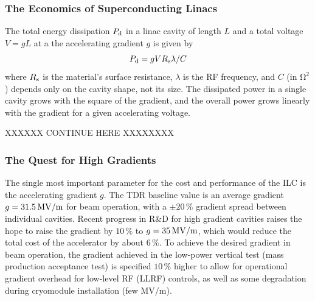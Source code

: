 \subsubsection{The Economics of Superconducting Linacs}

The total energy dissipation $P_{\mathrm{d}}$ in a linac cavity of length $L$ and a total voltage $V = g L$ at a the accelerating gradient $g$ is given by
$$
  P_{\mathrm{d}} = g V R_{\mathrm{s}} \lambda / C
$$
where $R_{\mathrm{s}}$ is the material's surface resistance, $\lambda$ is the RF frequency, and $C$ (in ${\mathrm{\Omega^2}}$) depends only on the cavity shape, not its size.
The dissipated power in a single cavity grows with the square of the gradient, 
and the overall power grows linearly with the gradient for a given accelerating voltage.

XXXXXX CONTINUE HERE XXXXXXXX


\subsubsection{The Quest for High Gradients}

The single most important parameter for the cost and performance of the ILC is the accelerating gradient $g$.
The TDR baseline value is an average gradient $g = 31.5\,{\mathrm{MV/m}}$ for beam operation, with a $\pm 20\,\%$ gradient spread between individual cavities.
Recent progress in R\&D for high gradient cavities raises the hope to raise the gradient by  $10\,\%$  to  $g = 35\,{\mathrm{MV/m}}$, which would reduce the total cost of the  accelerator by about  $6\,\%$.
To achieve the desired gradient in beam operation, the gradient achieved in the low-power vertical test (mass production acceptance test) is specified $10\,\%$ higher to allow for operational gradient overhead for low-level
RF (LLRF) controls, as well as some degradation during cryomodule installation (few ${\mathrm{MV/m}}$).

